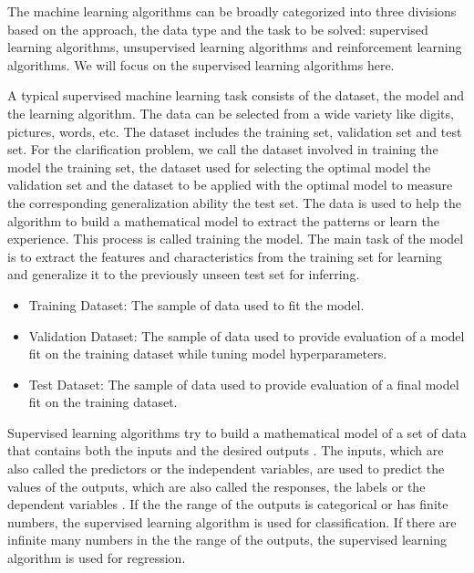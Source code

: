 The machine learning algorithms can be broadly categorized into three divisions based on the approach, the data type and the task to be solved: supervised learning algorithms, unsupervised learning algorithms and reinforcement learning algorithms. We will focus on the supervised learning algorithms here.

A typical supervised machine learning task consists of the dataset, the model and the learning algorithm.
The data can be selected from a wide variety like digits, pictures, words, etc. The dataset includes the training set, validation set and test set. For the clarification problem, we call the dataset involved in training the model the training set, the dataset used for selecting the optimal model the validation set and the dataset to be applied with the optimal model to measure the corresponding generalization ability the test set.
The data is used to help the algorithm to build a mathematical model to extract the patterns or learn the experience. This process is called training the model. The main task of the model is to extract the features and characteristics from the training set for learning and generalize it to the previously unseen test set for inferring.

\begin{itemize}
\item Training Dataset: The sample of data used to fit the model.
\item Validation Dataset: The sample of data used to provide evaluation of a model fit on the training dataset while tuning model hyperparameters.
\item Test Dataset: The sample of data used to provide evaluation of a final model fit on the training dataset.
\end{itemize}



Supervised learning algorithms try to build a mathematical model of a set of data that contains both the inputs and the desired outputs \cite{russell2010artificial}. The inputs, which are also called the predictors or the independent variables, are used to predict the values of the outputs, which are also called the responses, the labels or the dependent variables \cite{friedman2001elements}. If the the range of the outputs is categorical or has finite numbers, the supervised learning algorithm is used for classification. If there are infinite many numbers in the the range of the outputs, the supervised learning algorithm is used for regression.

